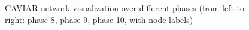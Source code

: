 \begin{figure}[htbp]
\begin{minipage}{.32\textwidth}
	\end{minipage}
	\caption{CAVIAR network visualization over different phases (from left to right: phase 8, phase 9, phase 10, with node labels)}
	\label{fig:visualization_phases_8_10_labels}
\end{figure}